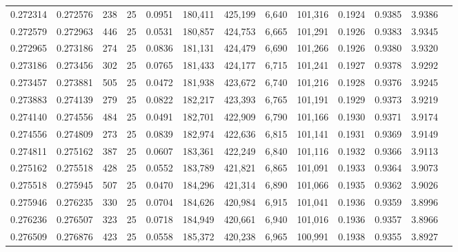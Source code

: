 \begin{tabular}{rrrrrrrrrrrrr}
0.272314 & 0.272576 &   238 &  25 &                                     0.0951 & 180,411 & 425,199 &   6,640 & 101,316 & 0.1924 & 0.9385 & 3.9386 \\
0.272579 & 0.272963 &   446 &  25 &                                     0.0531 & 180,857 & 424,753 &   6,665 & 101,291 & 0.1926 & 0.9383 & 3.9345 \\
0.272965 & 0.273186 &   274 &  25 &                                     0.0836 & 181,131 & 424,479 &   6,690 & 101,266 & 0.1926 & 0.9380 & 3.9320 \\
0.273186 & 0.273456 &   302 &  25 &                                     0.0765 & 181,433 & 424,177 &   6,715 & 101,241 & 0.1927 & 0.9378 & 3.9292 \\
0.273457 & 0.273881 &   505 &  25 &                                     0.0472 & 181,938 & 423,672 &   6,740 & 101,216 & 0.1928 & 0.9376 & 3.9245 \\
0.273883 & 0.274139 &   279 &  25 &                                     0.0822 & 182,217 & 423,393 &   6,765 & 101,191 & 0.1929 & 0.9373 & 3.9219 \\
0.274140 & 0.274556 &   484 &  25 &                                     0.0491 & 182,701 & 422,909 &   6,790 & 101,166 & 0.1930 & 0.9371 & 3.9174 \\
0.274556 & 0.274809 &   273 &  25 &                                     0.0839 & 182,974 & 422,636 &   6,815 & 101,141 & 0.1931 & 0.9369 & 3.9149 \\
0.274811 & 0.275162 &   387 &  25 &                                     0.0607 & 183,361 & 422,249 &   6,840 & 101,116 & 0.1932 & 0.9366 & 3.9113 \\
0.275162 & 0.275518 &   428 &  25 &                                     0.0552 & 183,789 & 421,821 &   6,865 & 101,091 & 0.1933 & 0.9364 & 3.9073 \\
0.275518 & 0.275945 &   507 &  25 &                                     0.0470 & 184,296 & 421,314 &   6,890 & 101,066 & 0.1935 & 0.9362 & 3.9026 \\
0.275946 & 0.276235 &   330 &  25 &                                     0.0704 & 184,626 & 420,984 &   6,915 & 101,041 & 0.1936 & 0.9359 & 3.8996 \\
0.276236 & 0.276507 &   323 &  25 &                                     0.0718 & 184,949 & 420,661 &   6,940 & 101,016 & 0.1936 & 0.9357 & 3.8966 \\
0.276509 & 0.276876 &   423 &  25 &                                     0.0558 & 185,372 & 420,238 &   6,965 & 100,991 & 0.1938 & 0.9355 & 3.8927 \\

\end{tabular}
